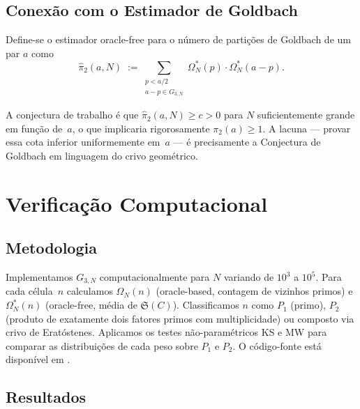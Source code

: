 \documentclass[12pt,a4paper]{article}
\theoremstyle{definition}
\theoremstyle{remark}
\newcommand{\Grid}{G_{3,N}}
\newcommand{\Om}{\Omega_N}           %
\newcommand{\Oms}{\Omega^*_N}        %
\newcommand{\Ss}{\mathfrak{S}}       %
\begin{document}
	\subsection{Conexão com o Estimador de Goldbach}
	
	Define-se o estimador oracle-free para o número de partições de Goldbach
	de um par $a$ como
	\begin{equation}
		\hat\pi_2(a,N) \;:=\!\!\sum_{\substack{p<a/2\\a-p\in\Grid}}
		\Oms(p)\cdot\Oms(a-p).
		\label{eq:estimador}
	\end{equation}
	
	A conjectura de trabalho é que $\hat\pi_2(a,N)\geq c>0$ para $N$
	suficientemente grande em função de~$a$, o que implicaria rigorosamente
	$\pi_2(a)\geq1$.
	A lacuna --- provar essa cota inferior uniformemente em~$a$ ---
	é precisamente a Conjectura de Goldbach em linguagem do crivo geométrico.
	
	\section{Verificação Computacional}
	
	\subsection{Metodologia}
	
	Implementamos $\Grid$ computacionalmente para $N$ variando de $10^3$ a
	$10^5$. Para cada célula~$n$ calculamos $\Om(n)$ (oracle-based, contagem
	de vizinhos primos) e $\Oms(n)$ (oracle-free, média de $\Ss(C)$).
	Classificamos $n$ como $P_1$ (primo), $P_2$ (produto de exatamente dois
	fatores primos com multiplicidade) ou composto via crivo de Eratóstenes.
	Aplicamos os testes não-paramétricos KS e MW para comparar as distribuições
	de cada peso sobre $P_1$ e $P_2$.
	O código-fonte está disponível em \cite{bandeira2026code}.
	
	\subsection{Resultados}
	
\end{document}
